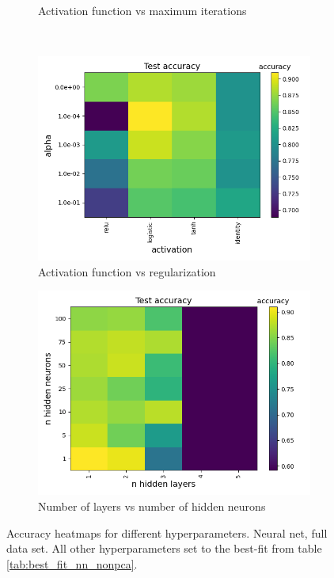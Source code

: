 \documentclass[a4paper]{article}
\begin{document}
\begin{figure}[H]
\begin{subfigure}{0.49\textwidth}
    \caption{Activation function vs maximum iterations}
  \end{subfigure}\\
  \begin{subfigure}{0.49\textwidth}
    \includegraphics[scale=0.45]{../figures/neural_net/heatmaps/heatmap_nbins200_pca0_seed4155_ts0.20_accuracy_activation_alpha.png}
    \caption{Activation function vs regularization}
  \end{subfigure}
  \begin{subfigure}{0.49\textwidth}
    \includegraphics[scale=0.45]{../figures/neural_net/heatmaps/heatmap_nbins200_pca0_seed4155_ts0.20_accuracy_n_hidden_layers_n_hidden_neurons.png}
    \caption{Number of layers vs number of hidden neurons}
  \end{subfigure}
  \caption{Accuracy heatmaps for different hyperparameters. Neural net, full data set. All other hyperparameters set to the best-fit from table \ref{tab:best_fit_nn_nonpca}.}
  \label{fig:app_nn_nonpca}
\end{figure}
\end{document}
